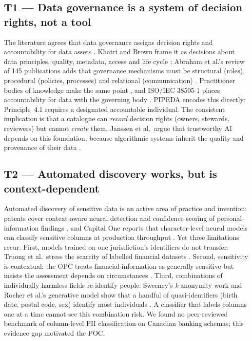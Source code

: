 \documentclass[journal,onecolumn,11pt]{IEEEtran}
\begin{document}
\subsection{T1 --- Data governance is a system of decision rights, not a tool}
The literature agrees that data governance assigns decision rights and accountability for data assets \cite{khatri,abraham,otto}. Khatri and Brown frame it as decisions about data principles, quality, metadata, access and life cycle \cite{khatri}; Abraham et al.'s review of 145 publications adds that governance mechanisms must be structural (roles), procedural (policies, processes) and relational (communication) \cite{abraham}. Practitioner bodies of knowledge make the same point \cite{dmbok}, and ISO/IEC 38505-1 places accountability for data with the governing body \cite{iso38505}. PIPEDA encodes this directly: Principle~4.1 requires a designated accountable individual. The consistent implication is that a catalogue can \emph{record} decision rights (owners, stewards, reviewers) but cannot \emph{create} them. Janssen et al.\ argue that trustworthy AI depends on this foundation, because algorithmic systems inherit the quality and provenance of their data \cite{janssen}.

\subsection{T2 --- Automated discovery works, but is context-dependent}
Automated discovery of sensitive data is an active area of practice and invention: patents cover context-aware neural detection \cite{pat_ibm} and confidence scoring of personal-information findings \cite{pat_bigid}, and Capital One reports that character-level neural models can classify sensitive columns at production throughput \cite{truong}. Yet three limitations recur. First, models trained on one jurisdiction's identifiers do not transfer: Truong et al.\ stress the scarcity of labelled financial datasets \cite{truong}. Second, sensitivity is contextual: the OPC treats financial information as generally sensitive but insists the assessment depends on circumstances \cite{opc_sensitive}. Third, combinations of individually harmless fields re-identify people: Sweeney's \emph{k}-anonymity work and Rocher et al.'s generative model show that a handful of quasi-identifiers (birth date, postal code, sex) identify most individuals \cite{sweeney,rocher}. A classifier that labels columns one at a time cannot see this combination risk. We found no peer-reviewed benchmark of column-level PII classification on Canadian banking schemas; this evidence gap motivated the POC.
\end{document}
